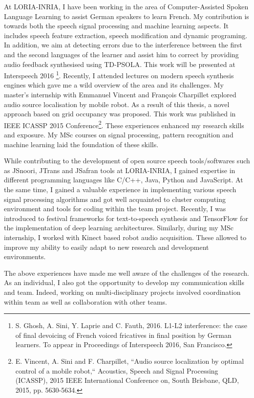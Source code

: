 \documentclass[
	pagenumber=false, %
	parskip=half, %
	fromalign=right, %
	foldmarks=false, %
	addrfield=false %
	]{scrlttr2}
\begin{document}
\begin{letter}
At LORIA-INRIA, I have been working in the area of Computer-Assisted Spoken Language Learning to assist German speakers to learn French. My contribution is towards both the speech signal processing and machine learning aspects. It includes speech feature extraction, speech modification and dynamic programing. In addition, we aim at detecting errors due to the interference between the first and the second languages of the learner and assist him to correct by providing audio feedback synthesised using TD\--PSOLA. This work will be presented at Interspeech 2016 \footnote{S. Ghosh, A. Sini, Y. Laprie and C. Fauth,  2016. L1-L2 interference: the case of final devoicing of French voiced fricatives in final position by German learners. To appear in Proceedings of Interspeech 2016, San Francisco.}. Recently, I attended lectures on modern speech synthesis engines which gave me a wild overview of the area and its challenges. My master's internship with Emmanuel Vincent and François Charpillet explored audio source localisation by mobile robot. As a result of this thesis, a novel approach based on grid occupancy was proposed. This work was published in IEEE ICASSP 2015 Conference\footnote{E. Vincent, A. Sini and F. Charpillet, ``Audio source localization by optimal control of a mobile robot,`` Acoustics, Speech and Signal Processing (ICASSP), 2015 IEEE International Conference on, South Brisbane, QLD, 2015, pp. 5630-5634.}. These experiences enhanced my research skills and exposure. My MSc courses on signal processing, pattern recognition and machine learning laid the foundation of these skills.   

		
While contributing to the development of open source speech tools/softwares such as JSnoori, JTrans and JSafran tools at LORIA-INRIA, I gained expertise in different programming languages like C/C++, Java, Python and JavaScript. At the same time, I gained a valuable experience in implementing  various speech signal processing algorithms and got well acquainted 	to cluster computing environment	and tools for coding within the team project. Recently, I was introduced to festival frameworks for text\--to\--speech synthesis and TensorFlow for the implementation of deep learning architectures. Similarly, during my MSc internship, I worked with Kinect based robot audio acquisition. These allowed to improve my ability to easily adapt to new research and development environments.    

 The above experiences have made me well aware of the challenges of the research. As an individual, I also got the opportunity to develop my communication skills and team. Indeed, working on multi-disciplinary projects involved coordination within  team as well as collaboration with other teams. 


\end{letter}
\end{document}
